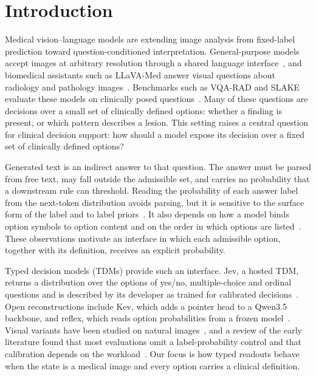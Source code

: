 \documentclass{article}
\begin{document}
\section{Introduction}
Medical vision--language models are extending image analysis from fixed-label prediction toward question-conditioned interpretation. General-purpose models accept images at arbitrary resolution through a shared language interface~\citep{wang2024qwen2vl,qwen35}, and biomedical assistants such as LLaVA-Med answer visual questions about radiology and pathology images~\citep{li2023llavamed}. Benchmarks such as VQA-RAD and SLAKE evaluate these models on clinically posed questions~\citep{lau2018vqarad,liu2021slake}. Many of these questions are decisions over a small set of clinically defined options: whether a finding is present, or which pattern describes a lesion. This setting raises a central question for clinical decision support: how should a model expose its decision over a fixed set of clinically defined options?

Generated text is an indirect answer to that question. The answer must be parsed from free text, may fall outside the admissible set, and carries no probability that a downstream rule can threshold. Reading the probability of each answer label from the next-token distribution avoids parsing, but it is sensitive to the surface form of the label and to label priors~\citep{holtzman2021surface,zhao2021calibrate}. It also depends on how a model binds option symbols to option content and on the order in which options are listed~\citep{robinson2023mcq,pezeshkpour2023order,zheng2024mcq}. These observations motivate an interface in which each admissible option, together with its definition, receives an explicit probability.

Typed decision models (TDMs) provide such an interface. Jev, a hosted TDM, returns a distribution over the options of yes/no, multiple-choice and ordinal questions and is described by its developer as trained for calibrated decisions~\citep{typesafe2026jev,typesafe2026blog}. Open reconstructions include Kev, which adds a pointer head to a Qwen3.5 backbone, and reflex, which reads option probabilities from a frozen model~\citep{palmer2026kev,raghavan2026reflex}. Visual variants have been studied on natural images~\citep{yu2026visualjev,zhou2026pixeljev}, and a review of the early literature found that most evaluations omit a label-probability control and that calibration depends on the workload~\citep{audit2026tdm}. Our focus is how typed readouts behave when the state is a medical image and every option carries a clinical definition.
\end{document}
